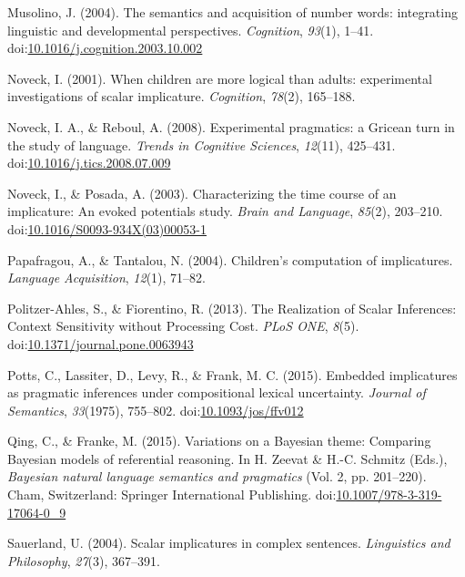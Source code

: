 \documentclass[man]{apa6}
\theoremstyle{definition}
\theoremstyle{definition}
\theoremstyle{definition}
\theoremstyle{remark}
\begin{document}
\hypertarget{ref-Musolino2004}{}
Musolino, J. (2004). The semantics and acquisition of number words:
integrating linguistic and developmental perspectives. \emph{Cognition},
\emph{93}(1), 1--41.
doi:\href{https://doi.org/10.1016/j.cognition.2003.10.002}{10.1016/j.cognition.2003.10.002}

\hypertarget{ref-Noveck2001}{}
Noveck, I. (2001). When children are more logical than adults:
experimental investigations of scalar implicature. \emph{Cognition},
\emph{78}(2), 165--188.

\hypertarget{ref-noveck2008}{}
Noveck, I. A., \& Reboul, A. (2008). Experimental pragmatics: a Gricean
turn in the study of language. \emph{Trends in Cognitive Sciences},
\emph{12}(11), 425--431.
doi:\href{https://doi.org/10.1016/j.tics.2008.07.009}{10.1016/j.tics.2008.07.009}

\hypertarget{ref-Noveck2003}{}
Noveck, I., \& Posada, A. (2003). Characterizing the time course of an
implicature: An evoked potentials study. \emph{Brain and Language},
\emph{85}(2), 203--210.
doi:\href{https://doi.org/10.1016/S0093-934X(03)00053-1}{10.1016/S0093-934X(03)00053-1}

\hypertarget{ref-Papafragou2004}{}
Papafragou, A., \& Tantalou, N. (2004). Children's computation of
implicatures. \emph{Language Acquisition}, \emph{12}(1), 71--82.

\hypertarget{ref-Politzer-Ahles2013}{}
Politzer-Ahles, S., \& Fiorentino, R. (2013). The Realization of Scalar
Inferences: Context Sensitivity without Processing Cost. \emph{PLoS
ONE}, \emph{8}(5).
doi:\href{https://doi.org/10.1371/journal.pone.0063943}{10.1371/journal.pone.0063943}

\hypertarget{ref-Potts2015}{}
Potts, C., Lassiter, D., Levy, R., \& Frank, M. C. (2015). Embedded
implicatures as pragmatic inferences under compositional lexical
uncertainty. \emph{Journal of Semantics}, \emph{33}(1975), 755--802.
doi:\href{https://doi.org/10.1093/jos/ffv012}{10.1093/jos/ffv012}

\hypertarget{ref-Qing2015}{}
Qing, C., \& Franke, M. (2015). Variations on a Bayesian theme:
Comparing Bayesian models of referential reasoning. In H. Zeevat \&
H.-C. Schmitz (Eds.), \emph{Bayesian natural language semantics and
pragmatics} (Vol. 2, pp. 201--220). Cham, Switzerland: Springer
International Publishing.
doi:\href{https://doi.org/10.1007/978-3-319-17064-0_9}{10.1007/978-3-319-17064-0\_9}

\hypertarget{ref-sauerland2004scalar}{}
Sauerland, U. (2004). Scalar implicatures in complex sentences.
\emph{Linguistics and Philosophy}, \emph{27}(3), 367--391.
\end{document}
